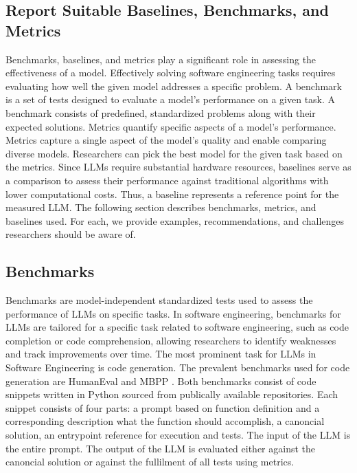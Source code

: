\documentclass[11pt]{article}
\begin{document}
\subsection{Report Suitable Baselines, Benchmarks, and Metrics}
Benchmarks, baselines, and metrics play a significant role in assessing the effectiveness of a model.
Effectively solving software engineering tasks requires evaluating how well the given model addresses a specific problem.
A benchmark is a set of tests designed to evaluate a model's performance on a given task.
A benchmark consists of predefined, standardized problems along with their expected solutions.
Metrics quantify specific aspects of a model's performance.
Metrics capture a single aspect of the model's quality and enable comparing diverse models.
Researchers can pick the best model for the given task based on the metrics.
Since LLMs require substantial hardware resources, baselines serve as a comparison to assess their performance against traditional algorithms with lower computational costs.
Thus, a baseline represents a reference point for the measured LLM.
The following section describes benchmarks, metrics, and baselines used.
For each, we provide examples, recommendations, and challenges researchers should be aware of.

\subsection{Benchmarks}

Benchmarks are model-independent standardized tests used to assess the performance of LLMs on specific tasks.
In software engineering, benchmarks for LLMs are tailored for a specific task related to software engineering, such as code completion or code comprehension, allowing researchers to identify weaknesses and track improvements over time.
The most prominent task for LLMs in Software Engineering is code generation.
The prevalent benchmarks used for code generation are HumanEval \cite{TODO} and MBPP \cite{MBPP}.
Both benchmarks consist of code snippets written in Python sourced from publically available repositories.
Each snippet consists of four parts: a prompt based on function definition and a corresponding description what the function should accomplish, a canoncial solution, an entrypoint reference for execution and tests.
The input of the LLM is the entire prompt.
The output of the LLM is evaluated either against the canoncial solution or against the fullilment of all tests using metrics.
\end{document}
